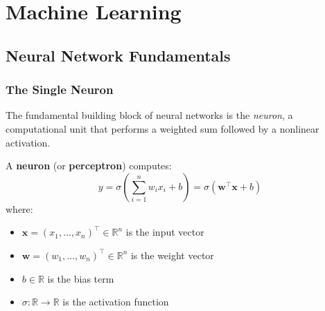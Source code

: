 \part{Machine Learning}

\chapter{Neural Network Fundamentals}

\section{The Single Neuron}

The fundamental building block of neural networks is the \emph{neuron}, a computational unit that performs a weighted sum followed by a nonlinear activation.

\begin{definition}[Neuron]
    A \textbf{neuron} (or \textbf{perceptron}) computes:
    \[
        y = \sigma\left(\sum_{i=1}^{n} w_i x_i + b\right) = \sigma(\mathbf{w}^\top \mathbf{x} + b)
    \]
    where:
    \begin{itemize}
        \item $\mathbf{x} = (x_1, \ldots, x_n)^\top \in \mathbb{R}^n$ is the input vector
        \item $\mathbf{w} = (w_1, \ldots, w_n)^\top \in \mathbb{R}^n$ is the weight vector
        \item $b \in \mathbb{R}$ is the bias term
        \item $\sigma: \mathbb{R} \to \mathbb{R}$ is the activation function
    \end{itemize}
\end{definition}

